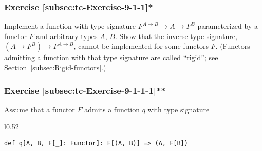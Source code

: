 \begin{comment}
The function $C^{A}\times C^{B}\rightarrow C^{A+B}$ cannot be implemented
for $C^{A}\triangleq\left(A\rightarrow P\right)+\left(A\rightarrow Q\right)$.
This more complicated contrafunctor $C$ is necessary because the
simpler contrafunctor $C^{A}\triangleq A\rightarrow P$ does not provide
a counterexample.
\end{comment}


\subsubsection{Exercise \label{subsec:tc-Exercise-9-1-1}\ref{subsec:tc-Exercise-9-1-1}{*}}

Implement a function with type signature $F^{A\rightarrow B}\rightarrow A\rightarrow F^{B}$
parameterized by a functor $F$ and arbitrary types $A$, $B$. Show
that the inverse type signature, $(A\rightarrow F^{B})\rightarrow F^{A\rightarrow B}$,
cannot be implemented for some functors $F$. (Functors admitting
a function with that type signature are called ``rigid''; see Section~\ref{subsec:Rigid-functors}.)

\subsubsection{Exercise \label{subsec:tc-Exercise-9-1-1-1}\ref{subsec:tc-Exercise-9-1-1-1}{*}{*}}

Assume that a functor $F$ admits a function $q$ with type signature

\begin{wrapfigure}{l}{0.52\columnwidth}%
\vspace{-0.75\baselineskip}
\begin{lstlisting}
def q[A, B, F[_]: Functor]: F[(A, B)] => (A, F[B])
\end{lstlisting}

\vspace{-1.6\baselineskip}
\end{wrapfigure}%

